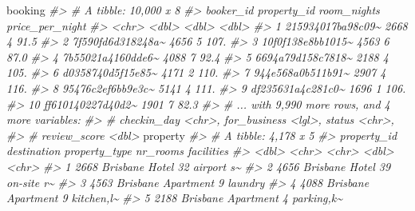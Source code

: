 \documentclass[
]{article}
\newenvironment{Shaded}{\begin{snugshade}}{\end{snugshade}}
\newcommand{\CommentTok}[1]{\textcolor[rgb]{0.56,0.35,0.01}{\textit{#1}}}
\newcommand{\NormalTok}[1]{#1}
\begin{document}
\begin{Shaded}
\begin{Highlighting}[]
\NormalTok{booking}
\CommentTok{\#\textgreater{} \# A tibble: 10,000 x 8}
\CommentTok{\#\textgreater{}    booker\_id         property\_id room\_nights price\_per\_night}
\CommentTok{\#\textgreater{}    \textless{}chr\textgreater{}                   \textless{}dbl\textgreater{}       \textless{}dbl\textgreater{}           \textless{}dbl\textgreater{}}
\CommentTok{\#\textgreater{}  1 215934017ba98c09\textasciitilde{}        2668           4            91.5}
\CommentTok{\#\textgreater{}  2 7f590fd6d318248a\textasciitilde{}        4656           5           107. }
\CommentTok{\#\textgreater{}  3 10f0f138e8bb1015\textasciitilde{}        4563           6            87.0}
\CommentTok{\#\textgreater{}  4 7b55021a4160dde6\textasciitilde{}        4088           7            92.4}
\CommentTok{\#\textgreater{}  5 6694a79d158c7818\textasciitilde{}        2188           4           105. }
\CommentTok{\#\textgreater{}  6 d0358740d5f15e85\textasciitilde{}        4171           2           110. }
\CommentTok{\#\textgreater{}  7 944e568a0b511b91\textasciitilde{}        2907           4           116. }
\CommentTok{\#\textgreater{}  8 95476c2ef6bb9e3c\textasciitilde{}        5141           4           111. }
\CommentTok{\#\textgreater{}  9 df235631a4c281c0\textasciitilde{}        1696           1           106. }
\CommentTok{\#\textgreater{} 10 ff610140227d40d2\textasciitilde{}        1901           7            82.3}
\CommentTok{\#\textgreater{} \# ... with 9,990 more rows, and 4 more variables:}
\CommentTok{\#\textgreater{} \#   checkin\_day \textless{}chr\textgreater{}, for\_business \textless{}lgl\textgreater{}, status \textless{}chr\textgreater{},}
\CommentTok{\#\textgreater{} \#   review\_score \textless{}dbl\textgreater{}}
\NormalTok{property}
\CommentTok{\#\textgreater{} \# A tibble: 4,178 x 5}
\CommentTok{\#\textgreater{}    property\_id destination property\_type nr\_rooms facilities}
\CommentTok{\#\textgreater{}          \textless{}dbl\textgreater{} \textless{}chr\textgreater{}       \textless{}chr\textgreater{}            \textless{}dbl\textgreater{} \textless{}chr\textgreater{}     }
\CommentTok{\#\textgreater{}  1        2668 Brisbane    Hotel               32 airport s\textasciitilde{}}
\CommentTok{\#\textgreater{}  2        4656 Brisbane    Hotel               39 on{-}site r\textasciitilde{}}
\CommentTok{\#\textgreater{}  3        4563 Brisbane    Apartment            9 laundry   }
\CommentTok{\#\textgreater{}  4        4088 Brisbane    Apartment            9 kitchen,l\textasciitilde{}}
\CommentTok{\#\textgreater{}  5        2188 Brisbane    Apartment            4 parking,k\textasciitilde{}}

\end{Highlighting}
\end{Shaded}
\end{document}
